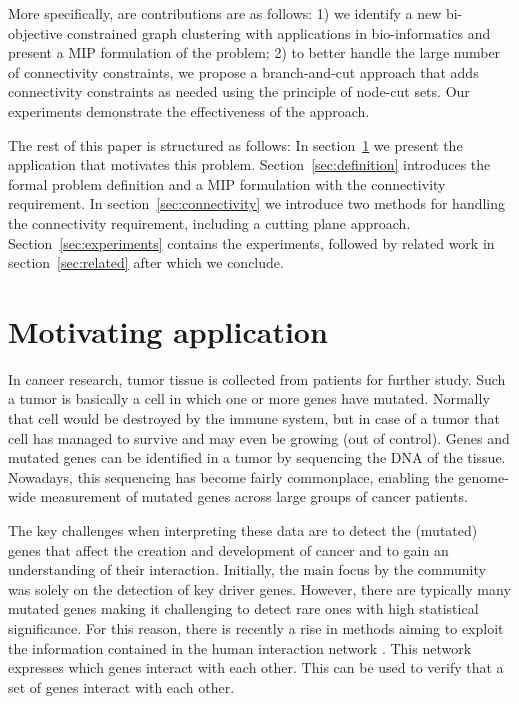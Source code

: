 \documentclass[conference]{IEEEtran}
\begin{document}
More specifically, are contributions are as follows: 1) we identify a new bi-objective constrained graph clustering with applications in bio-informatics and present a MIP formulation of the problem; 2) to better handle the large number of connectivity constraints, we propose a branch-and-cut approach that adds connectivity constraints as needed using the principle of node-cut sets. Our experiments demonstrate the effectiveness of the approach.

The rest of this paper is structured as follows:  In
section~\ref{sec:motivation} we present the application that motivates
this problem.  Section~\ref{sec:definition} introduces the formal
problem definition and a MIP formulation with the connectivity requirement.
In section~\ref{sec:connectivity} we introduce two methods for handling the connectivity requirement, including a cutting plane approach. Section~\ref{sec:experiments} contains the experiments, followed by related work in section~\ref{sec:related} after which we conclude.


\section{Motivating application}
\label{sec:motivation}
In cancer research, tumor tissue is collected from patients for further study. Such a tumor is basically a cell in which one or more genes have mutated. Normally that cell would be destroyed by the immune system, but in case of a tumor that cell has managed to survive and may even be growing (out of control).
Genes and mutated genes can be identified in a tumor by sequencing the DNA of the tissue. Nowadays, this sequencing has become fairly commonplace, enabling the genome-wide measurement of mutated genes across large groups of cancer patients.

The key challenges when interpreting these data are to detect the (mutated) genes that affect the creation and development of cancer and to gain an understanding of their interaction. Initially, the main focus by the community was solely on the detection of key driver genes. However, there are typically many mutated genes making it challenging to detect rare ones with high statistical significance. For this reason, there is recently a rise in methods aiming to exploit the information contained in the human interaction network \cite{leiserson2015pan,pulido2015ssa}. This network expresses which genes interact with each other. This can be used to verify that a set of genes interact with each other.
\end{document}
